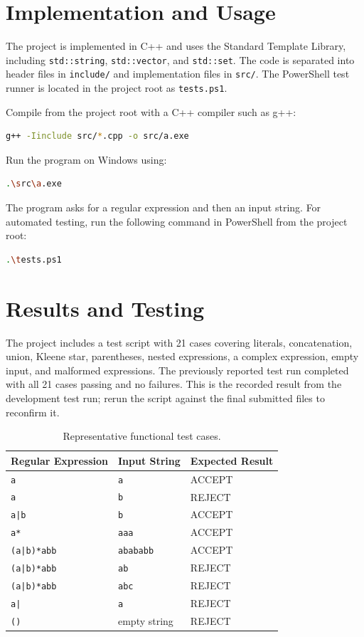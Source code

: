 \documentclass[12pt,a4paper]{report}
\begin{document}
\section{Implementation and Usage}
The project is implemented in C++ and uses the Standard Template Library, including \texttt{std::string}, \texttt{std::vector}, and \texttt{std::set}. The code is separated into header files in \texttt{include/} and implementation files in \texttt{src/}. The PowerShell test runner is located in the project root as \texttt{tests.ps1}.

Compile from the project root with a C++ compiler such as g++:
\begin{lstlisting}[language=bash,numbers=none]
g++ -Iinclude src/*.cpp -o src/a.exe
\end{lstlisting}
Run the program on Windows using:
\begin{lstlisting}[language=bash,numbers=none]
.\src\a.exe
\end{lstlisting}
The program asks for a regular expression and then an input string. For automated testing, run the following command in PowerShell from the project root:
\begin{lstlisting}[language=bash,numbers=none]
.\tests.ps1
\end{lstlisting}

\section{Results and Testing}
The project includes a test script with 21 cases covering literals, concatenation, union, Kleene star, parentheses, nested expressions, a complex expression, empty input, and malformed expressions. The previously reported test run completed with all 21 cases passing and no failures. This is the recorded result from the development test run; rerun the script against the final submitted files to reconfirm it.

\begin{table}[htbp]
\centering
\caption{Representative functional test cases.}
\label{tab:tests}
\begin{tabular}{|l|l|l|}
\hline
\textbf{Regular Expression} & \textbf{Input String} & \textbf{Expected Result} \\
\hline
\texttt{a} & \texttt{a} & ACCEPT \\
\texttt{a} & \texttt{b} & REJECT \\
\texttt{a|b} & \texttt{b} & ACCEPT \\
\texttt{a*} & \texttt{aaa} & ACCEPT \\
\texttt{(a|b)*abb} & \texttt{abababb} & ACCEPT \\
\texttt{(a|b)*abb} & \texttt{ab} & REJECT \\
\texttt{(a|b)*abb} & \texttt{abc} & REJECT \\
\texttt{a|} & \texttt{a} & REJECT \\
\texttt{()} & empty string & REJECT \\
\hline
\end{tabular}
\end{table}
\end{document}
